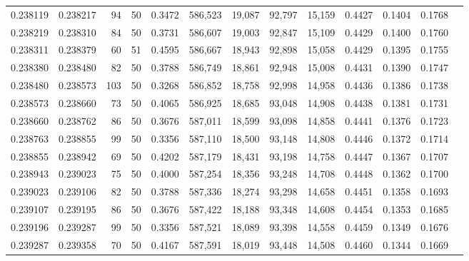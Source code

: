 \begin{tabular}{rrrrrrrrrrrrr}
0.238119 & 0.238217 &    94 &  50 &                                     0.3472 & 586,523 &  19,087 &  92,797 &  15,159 & 0.4427 & 0.1404 & 0.1768 \\
0.238219 & 0.238310 &    84 &  50 &                                     0.3731 & 586,607 &  19,003 &  92,847 &  15,109 & 0.4429 & 0.1400 & 0.1760 \\
0.238311 & 0.238379 &    60 &  51 &                                     0.4595 & 586,667 &  18,943 &  92,898 &  15,058 & 0.4429 & 0.1395 & 0.1755 \\
0.238380 & 0.238480 &    82 &  50 &                                     0.3788 & 586,749 &  18,861 &  92,948 &  15,008 & 0.4431 & 0.1390 & 0.1747 \\
0.238480 & 0.238573 &   103 &  50 &                                     0.3268 & 586,852 &  18,758 &  92,998 &  14,958 & 0.4436 & 0.1386 & 0.1738 \\
0.238573 & 0.238660 &    73 &  50 &                                     0.4065 & 586,925 &  18,685 &  93,048 &  14,908 & 0.4438 & 0.1381 & 0.1731 \\
0.238660 & 0.238762 &    86 &  50 &                                     0.3676 & 587,011 &  18,599 &  93,098 &  14,858 & 0.4441 & 0.1376 & 0.1723 \\
0.238763 & 0.238855 &    99 &  50 &                                     0.3356 & 587,110 &  18,500 &  93,148 &  14,808 & 0.4446 & 0.1372 & 0.1714 \\
0.238855 & 0.238942 &    69 &  50 &                                     0.4202 & 587,179 &  18,431 &  93,198 &  14,758 & 0.4447 & 0.1367 & 0.1707 \\
0.238943 & 0.239023 &    75 &  50 &                                     0.4000 & 587,254 &  18,356 &  93,248 &  14,708 & 0.4448 & 0.1362 & 0.1700 \\
0.239023 & 0.239106 &    82 &  50 &                                     0.3788 & 587,336 &  18,274 &  93,298 &  14,658 & 0.4451 & 0.1358 & 0.1693 \\
0.239107 & 0.239195 &    86 &  50 &                                     0.3676 & 587,422 &  18,188 &  93,348 &  14,608 & 0.4454 & 0.1353 & 0.1685 \\
0.239196 & 0.239287 &    99 &  50 &                                     0.3356 & 587,521 &  18,089 &  93,398 &  14,558 & 0.4459 & 0.1349 & 0.1676 \\
0.239287 & 0.239358 &    70 &  50 &                                     0.4167 & 587,591 &  18,019 &  93,448 &  14,508 & 0.4460 & 0.1344 & 0.1669 \\

\end{tabular}
